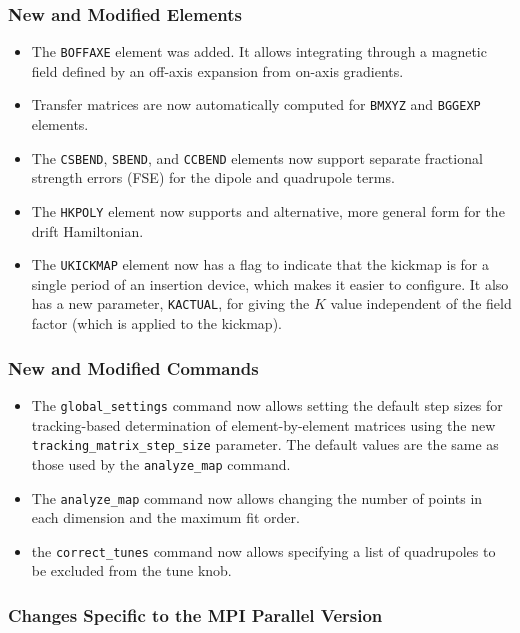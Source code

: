 \documentclass[11pt]{article}
\begin{document}
\subsubsection{New and Modified Elements}
\begin{itemize}
\item The \verb|BOFFAXE| element was added. It allows integrating through a magnetic field defined by an off-axis
  expansion from on-axis gradients. 
\item Transfer matrices are now automatically computed for \verb|BMXYZ| and \verb|BGGEXP| elements.
\item The \verb|CSBEND|, \verb|SBEND|, and \verb|CCBEND| elements now support separate fractional strength errors (FSE) for
  the dipole and quadrupole terms.
\item The \verb|HKPOLY| element now supports and alternative, more general form for the drift Hamiltonian.
\item The \verb|UKICKMAP| element now has a flag to indicate that the kickmap is for a single period of an insertion
  device, which makes it easier to configure. It also has a new parameter, \verb|KACTUAL|, for giving the $K$ value
  independent of the field factor (which is applied to the kickmap).
\end{itemize}

\subsubsection{New and Modified Commands}
\begin{itemize}
\item The \verb|global_settings| command now allows setting the default step sizes for tracking-based determination
  of element-by-element matrices using the new \verb|tracking_matrix_step_size| parameter. The default values are
  the same as those used by the \verb|analyze_map| command.
\item The \verb|analyze_map| command now allows changing the number of points in each dimension and the maximum fit order.
\item the \verb|correct_tunes| command now allows specifying a list of quadrupoles to be excluded from the tune knob.
\end{itemize}

\subsubsection{Changes Specific to the MPI Parallel Version}
\end{document}
